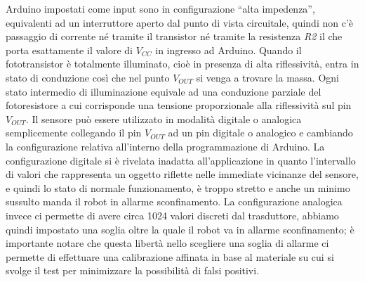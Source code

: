 Arduino impostati come input sono in configurazione ``alta impedenza'', 
equivalenti ad un interruttore aperto dal punto di vista circuitale, quindi 
non c'è passaggio di corrente né tramite il transistor né tramite la 
resistenza \textit{R2} il che porta esattamente il valore di $V_{CC}$ in 
ingresso ad Arduino. Quando il fototransistor è totalmente illuminato, cioè in 
presenza di alta riflessività, entra in stato di conduzione così che nel punto 
$V_{OUT}$ si venga a trovare la massa. Ogni stato intermedio di illuminazione 
equivale ad una conduzione parziale del fotoresistore a cui corrisponde una 
tensione proporzionale alla riflessività sul pin $V_{OUT}$. Il sensore può 
essere utilizzato in modalità digitale o analogica semplicemente collegando il 
pin $V_{OUT}$ ad un pin digitale o analogico e cambiando la configurazione 
relativa all'interno della programmazione di Arduino. La configurazione 
digitale si è rivelata inadatta all'applicazione in quanto l'intervallo di 
valori che rappresenta un oggetto riflette nelle immediate vicinanze del 
sensore, e quindi lo stato di normale funzionamento, è troppo stretto e anche 
un minimo sussulto manda il robot in allarme sconfinamento. La configurazione 
analogica invece ci permette di avere circa 1024 valori discreti dal 
trasduttore, abbiamo quindi impostato una soglia oltre la quale il robot va in 
allarme sconfinamento; è importante notare che questa libertà nello scegliere 
una soglia di allarme ci permette di effettuare una calibrazione affinata in 
base al materiale su cui si svolge il test per minimizzare la possibilità di 
falsi positivi. 

